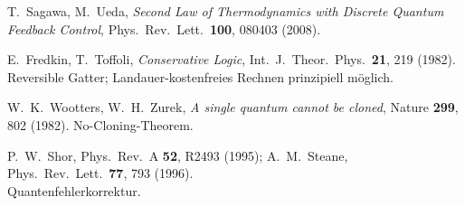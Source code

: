 \begin{description}[leftmargin=3.5em,style=sameline,itemsep=0.4em]
\item[{[B10]}] T.~Sagawa, M.~Ueda,
  \textit{Second Law of Thermodynamics with Discrete Quantum Feedback Control},
  Phys.\ Rev.\ Lett.\ \textbf{100}, 080403 (2008).

\item[{[B11]}] E.~Fredkin, T.~Toffoli,
  \textit{Conservative Logic},
  Int.\ J.\ Theor.\ Phys.\ \textbf{21}, 219 (1982). \\
  Reversible Gatter; Landauer-kostenfreies Rechnen prinzipiell möglich.

\item[{[B12]}] W.~K.~Wootters, W.~H.~Zurek,
  \textit{A single quantum cannot be cloned},
  Nature \textbf{299}, 802 (1982). No-Cloning-Theorem.

\item[{[B13]}] P.~W.~Shor, Phys.\ Rev.\ A \textbf{52}, R2493 (1995);
  A.~M.~Steane, Phys.\ Rev.\ Lett.\ \textbf{77}, 793 (1996). \\
  Quantenfehlerkorrektur.

\end{description}

\bigskip
{}
